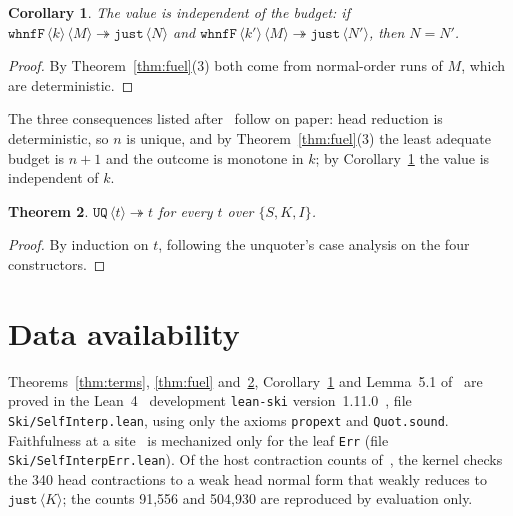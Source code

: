 \documentclass[11pt]{amsart}
\newtheorem{theorem}{Theorem}
\newtheorem{corollary}[theorem]{Corollary}
\newcommand{\tw}[1]{\texttt{#1}}
\newcommand{\enc}[1]{\langle #1\rangle}
\newcommand{\red}{\twoheadrightarrow}
\begin{document}
\begin{corollary}\label{cor:indep}
The value is independent of the budget: if $\tw{whnfF}\,\enc k\,\enc M\red\tw{just}\,\enc N$ and
$\tw{whnfF}\,\enc{k'}\,\enc M\red\tw{just}\,\enc{N'}$, then $N=N'$.
\end{corollary}
\begin{proof}
By Theorem~\ref{thm:fuel}(3) both come from normal-order runs of $M$, which are deterministic.
\end{proof}

\noindent The three consequences listed after~\citep[Thm.~5.2]{davis-si} follow on paper: head
reduction is deterministic, so $n$ is unique, and by Theorem~\ref{thm:fuel}(3) the least adequate
budget is $n+1$ and the outcome is monotone in $k$; by Corollary~\ref{cor:indep} the value is
independent of $k$.

\begin{theorem}\label{thm:unquote}
$\tw{UQ}\,\enc t\red t$ for every $t$ over $\{S,K,I\}$.
\end{theorem}
\begin{proof}
By induction on $t$, following the unquoter's case analysis on the four constructors.
\end{proof}

\section*{Data availability}
\sloppy
Theorems~\ref{thm:terms}, \ref{thm:fuel} and~\ref{thm:unquote}, Corollary~\ref{cor:indep} and
Lemma~5.1 of~\citep{davis-si} are proved in the Lean~4~\citep{lean4} development \texttt{lean-ski}
version~1.11.0~\citep{leanski}, file \texttt{Ski/SelfInterp.lean}, using only the axioms
\texttt{propext} and \texttt{Quot.sound}. Faithfulness at a site~\citep[Lemma~5.3]{davis-si} is
mechanized only for the leaf \tw{Err} (file \texttt{Ski/SelfInterpErr.lean}). Of the host
contraction counts of~\citep[\S3.2]{davis-si}, the kernel checks the 340 head contractions to a weak
head normal form that weakly reduces to $\tw{just}\,\enc K$; the counts 91,556 and 504,930 are
reproduced by evaluation only.



\end{document}
